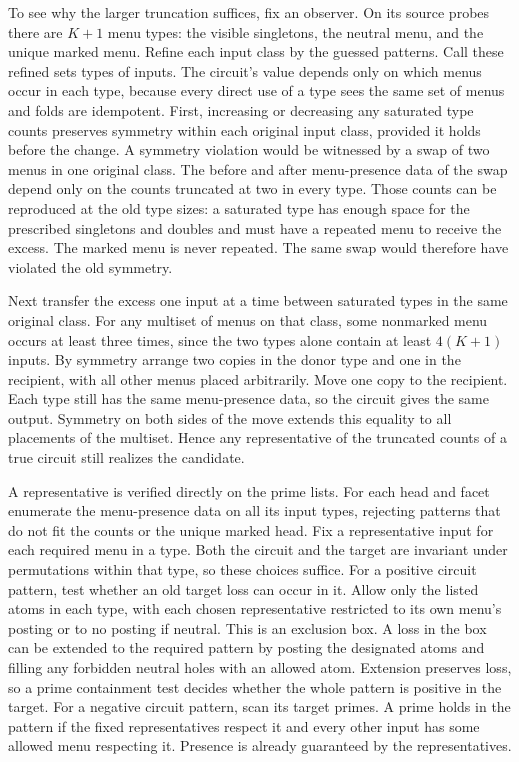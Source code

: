 To see why the larger truncation suffices, fix an observer.
On its source probes there are $K+1$ menu types: the visible
singletons, the neutral menu, and the unique marked menu.
Refine each input class by the guessed patterns. Call these
refined sets types of inputs. The circuit's value depends only
on which menus occur in each type, because every direct use
of a type sees the same set of menus and folds are idempotent.
First, increasing or decreasing any saturated type counts
preserves symmetry within each original input class, provided
it holds before the change. A symmetry violation would be
witnessed by a swap of two menus in one original class. The
before and after menu-presence data of the swap depend only
on the counts truncated at two in every type. Those counts
can be reproduced at the old type sizes: a saturated type
has enough space for the prescribed singletons and doubles
and must have a repeated menu to receive the excess. The
marked menu is never repeated. The same swap would therefore
have violated the old symmetry.

Next transfer the excess one input at a time between
saturated types in the same original class. For any multiset
of menus on that class, some nonmarked menu occurs at least
three times, since the two types alone contain at least
$4(K+1)$ inputs. By symmetry arrange two copies in the donor
type and one in the recipient, with all other menus placed
arbitrarily. Move one copy to the recipient. Each type still
has the same menu-presence data, so the circuit gives the
same output. Symmetry on both sides of the move extends
this equality to all placements of the multiset. Hence
any representative of the truncated counts of a true
circuit still realizes the candidate.

A representative is verified directly on the prime lists.
For each head and facet enumerate the menu-presence data
on all its input types, rejecting patterns that do not fit
the counts or the unique marked head. Fix a representative
input for each required menu in a type. Both the circuit
and the target are invariant under permutations within
that type, so these choices suffice. For a positive circuit
pattern, test whether an old target loss can occur in it.
Allow only the listed atoms in each type, with each chosen
representative restricted to its own menu's posting or to
no posting if neutral. This is an exclusion box. A loss
in the box can be extended to the required pattern by
posting the designated atoms and filling any forbidden
neutral holes with an allowed atom. Extension preserves
loss, so a prime containment test decides whether the
whole pattern is positive in the target. For a negative
circuit pattern, scan its target primes. A prime holds in
the pattern if the fixed representatives respect it and
every other input has some allowed menu respecting it.
Presence is already guaranteed by the representatives.

